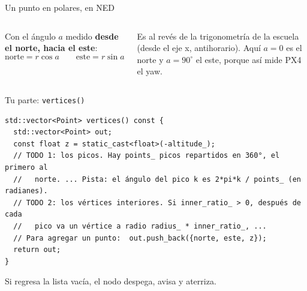 \begin{frame}{Un punto en polares, en NED}
  \begin{columns}[c]
    \centering
    \small
    Con el ángulo $a$ medido \textbf{desde el norte, hacia el este}:
    \[ \text{norte} = r\cos a \qquad \text{este} = r\sin a \]
    \begin{ojo}
      \small Es al revés de la trigonometría de la escuela (desde el eje x, antihorario). Aquí
      $a = 0$ es el norte y $a = 90^\circ$ el este, porque así mide PX4 el yaw.
    \end{ojo}
  \end{columns}
\end{frame}

\begin{frame}[fragile]{Tu parte: \texttt{vertices()}}
  \begin{lstlisting}[style=cpp,caption={Lo que trae el reto (estrella\_show.cpp)}]
std::vector<Point> vertices() const {
  std::vector<Point> out;
  const float z = static_cast<float>(-altitude_);
  // TODO 1: los picos. Hay points_ picos repartidos en 360°, el primero al
  //   norte. ... Pista: el ángulo del pico k es 2*pi*k / points_ (en radianes).
  // TODO 2: los vértices interiores. Si inner_ratio_ > 0, después de cada
  //   pico va un vértice a radio radius_ * inner_ratio_, ...
  // Para agregar un punto:  out.push_back({norte, este, z});
  return out;
}
  \end{lstlisting}
  \small Si  regresa la lista vacía, el nodo despega, avisa y aterriza.
\end{frame}

